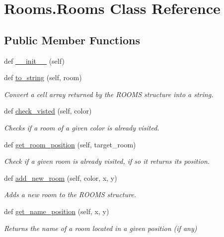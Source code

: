 \hypertarget{classRooms_1_1Rooms}{}\section{Rooms.\+Rooms Class Reference}
\label{classRooms_1_1Rooms}
\subsection*{Public Member Functions}
\begin{DoxyCompactItemize}
\item 
def \hyperlink{classRooms_1_1Rooms_a33491cd5c0e240b173cc7b5b7c004614}{\+\_\+\+\_\+init\+\_\+\+\_\+} (self)
\item 
def \hyperlink{classRooms_1_1Rooms_af4de8388233d61aa35d1567f7a1499c5}{to\+\_\+string} (self, room)
\begin{DoxyCompactList}\small\item\em Convert a cell array returned by the R\+O\+O\+MS structure into a string. \end{DoxyCompactList}\item 
def \hyperlink{classRooms_1_1Rooms_a103b874aa482a4bbc32b7e57e310b557}{check\+\_\+visted} (self, color)
\begin{DoxyCompactList}\small\item\em Checks if a room of a given color is already visited. \end{DoxyCompactList}\item 
def \hyperlink{classRooms_1_1Rooms_a0b0c05bef66a8c33523caa1013abe2e7}{get\+\_\+room\+\_\+position} (self, target\+\_\+room)
\begin{DoxyCompactList}\small\item\em Check if a given room is already visited, if so it returns its position. \end{DoxyCompactList}\item 
def \hyperlink{classRooms_1_1Rooms_a266a056a0e82793932d3dfbf0c492c29}{add\+\_\+new\+\_\+room} (self, color, x, y)
\begin{DoxyCompactList}\small\item\em Adds a new room to the R\+O\+O\+MS structure. \end{DoxyCompactList}\item 
def \hyperlink{classRooms_1_1Rooms_addc0dcc8b9628a35044e1ffbd67a1e0d}{get\+\_\+name\+\_\+position} (self, x, y)
\begin{DoxyCompactList}\small\item\em Returns the name of a room located in a given position (if any) \end{DoxyCompactList}\item 

\end{DoxyCompactItemize}
